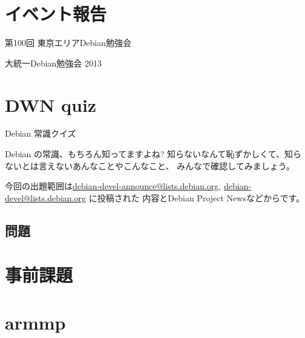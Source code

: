 \section{イベント報告}

\begin{frame}{第100回 東京エリアDebian勉強会}
 　
\end{frame}

\begin{frame}{大統一Debian勉強会 2013}
\end{frame}

\section{DWN quiz}
\begin{frame}{Debian 常識クイズ}

  Debian の常識、もちろん知ってますよね?
知らないなんて恥ずかしくて、知らないとは言えないあんなことやこんなこと、
みんなで確認してみましょう。

今回の出題範囲は\url{debian-devel-announce@lists.debian.org},
\url{debian-devel@lists.debian.org} に投稿された
内容とDebian Project Newsなどからです。

\end{frame}

\subsection{問題}


\section{事前課題}

{\footnotesize
 
}

\section{armmp}

